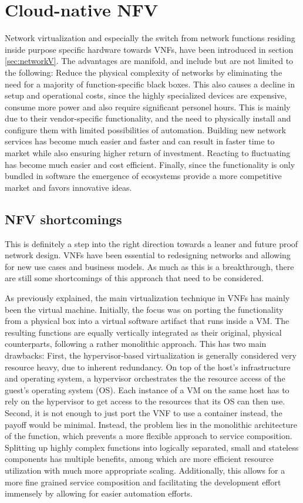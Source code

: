 \section{Cloud-native NFV}
Network virtualization and especially the switch from network functions residing inside purpose specific hardware towards VNFs, have been introduced in section \ref{sec:networkV}. The advantages are manifold, and include but are not limited to the following: Reduce the physical complexity of networks by eliminating the need for a majority of function-specific black boxes. This also causes a decline in setup and operational costs, since the highly specialized devices are expensive, consume more power and also require significant personel hours. This is mainly due to their vendor-specific functionality, and the need to physically install and configure them with limited possibilities of automation. Building new network services has become much easier and faster and can result in faster time to market while also ensuring higher return of investment. Reacting to fluctuating has become much easier and cost efficient. Finally, since the functionality is only bundled in software the emergence of ecosystems provide a more competitive market and favors innovative ideas. 

\subsection{NFV shortcomings}
This is definitely a step into the right direction towards a leaner and future proof network design. VNFs have been essential to redesigning networks and allowing for new use cases and business models. As much as this is a breakthrough, there are still some shortcomings of this approach that need to be considered. 

As previously explained, the main virtualization technique in VNFs has mainly been the virtual machine. Initially, the focus was on porting the functionality from a physical box into a virtual software artifact that runs inside a VM. The resulting functions are equally vertically integrated as their original, physical counterparts, following a rather monolithic approach. This has two main drawbacks:
First, the hypervisor-based virtualization is generally considered very resource heavy, due to inherent redundancy. On top of the host's infrastructure and operating system, a hypervisor orchestrates the the resource access of the guest's operating system (OS). Each instance of a VM on the same host has to rely on the hypervisor to get access to the resources that its OS can then use. 
Second, it is not enough to just port the VNF to use a container instead, the payoff would be minimal. Instead, the problem lies in the monolithic architecture of the function, which prevents a more flexible approach to service composition. Splitting up highly complex functions into logically separated, small and stateless components has multiple benefits, among which are more efficient resource utilization with much more appropriate scaling. Additionally, this allows for a more fine grained service composition and facilitating the development effort immensely by allowing for easier automation efforts. 

